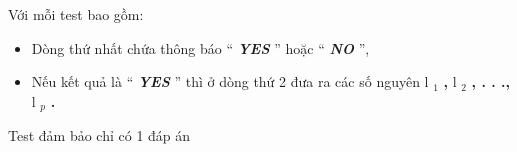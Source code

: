 Với mỗi test bao gồm:
\begin{itemize}
	\item Dòng thứ nhất chứa thông báo “ \textbf{\emph{ YES }} ” hoặc “ \textbf{\emph{ NO }} ”,
	\item Nếu kết quả là “ \textbf{\emph{ YES }} ” thì ở dòng thứ 2 đưa ra các số nguyên l \textbf{$_ 1 $}\textbf{ , } l \textbf{$_ 2 $}\textbf{ , . . ., } l \emph{$_ p $}\textbf{ . }
\end{itemize}

Test đảm bảo chỉ có 1 đáp án

\